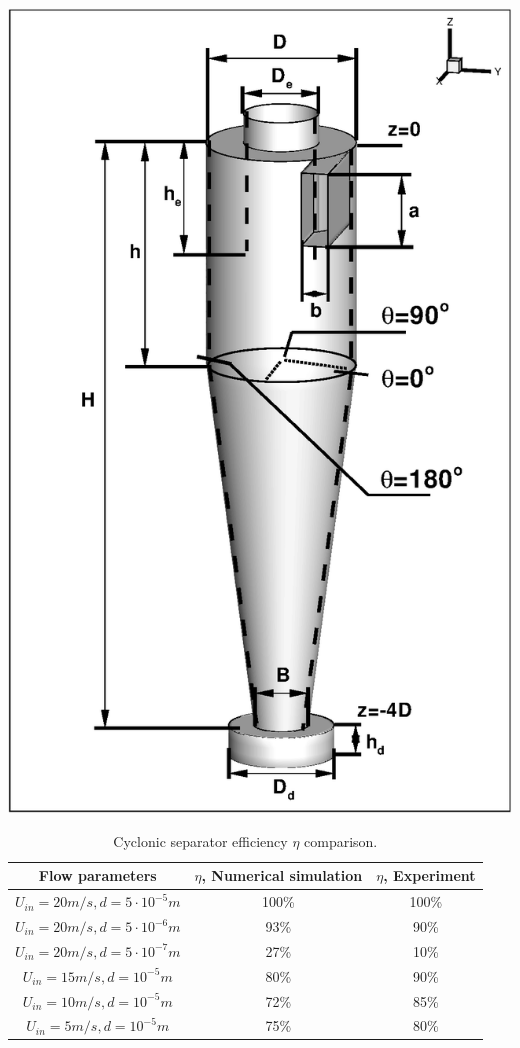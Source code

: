 \documentclass[a4paper]{jpconf}
\begin{document}
  \begin{minipage}{0.35\textwidth}
    \includegraphics[scale=0.43]{cycloneGeometryTeta}
	\label{fig:cycloneGeometryScheme}
  \end{minipage}
\begin{table}[h]
\begin{center}
		\caption{Cyclonic separator efficiency $\eta$ comparison.}
		\label{tableSolution}
		\begin{tabular}{|c|c|c|}
			\hline
			Flow parameters & $\eta$, Numerical simulation & $\eta$, Experiment\\
			\hline
			$U_{in}=20m/s, d=5 \cdot 10^{-5}m$ & 100\% & 100\% \\
			\hline
			$U_{in}=20m/s, d=5 \cdot 10^{-6}m$ & 93\% & 90\%\\
			\hline
			$U_{in}=20m/s, d=5 \cdot 10^{-7}m$ & 27\% & 10\%\\
			\hline
			$U_{in}=15m/s, d=10^{-5}m$ & 80\% & 90\% \\
			\hline
			$U_{in}=10m/s, d=10^{-5}m$ & 72\% & 85\% \\
			\hline
			$U_{in}=5m/s, d=10^{-5}m$ & 75\% & 80\% \\
			\hline
		\end{tabular}
\end{center}
	\end{table}
\end{document}
